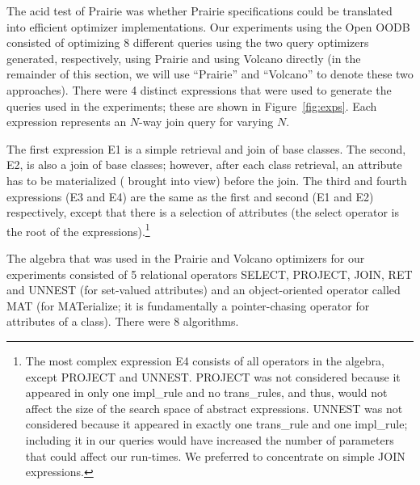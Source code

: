 The acid test of Prairie was whether Prairie specifications could be
translated into efficient optimizer implementations.  Our experiments
using the Open OODB consisted of optimizing 8 different queries using
the two query optimizers generated, respectively, using Prairie and
using Volcano directly (in the remainder of this section, we will use
``Prairie'' and ``Volcano'' to denote these two approaches).  There
were 4 distinct expressions that were used to generate the queries used
in the experiments; these are shown in Figure~\ref{fig:exps}.  Each
expression represents an $N$-way join query for varying $N$.

The first expression E1 is a simple retrieval and join of base
classes.  The second, E2, is also a join of base classes; however,
after each class retrieval, an attribute has to be materialized (\ie
brought into view) before the join.  The third and fourth expressions
(E3 and E4) are the same as the first and second (E1 and E2)
respectively, except that there is a selection of attributes (the
select operator is the root of the expressions).\footnote{ The most
complex expression E4 consists of all operators in the algebra, except
PROJECT and UNNEST.  PROJECT was not considered because it appeared in
only one impl\_rule and no trans\_rules, and thus, would not affect the
size of the search space of abstract expressions.  UNNEST was not
considered because it appeared in exactly one trans\_rule and one
impl\_rule; including it in our queries would have increased the number
of parameters that could affect our run-times.  We preferred to
concentrate on simple JOIN expressions.}

The algebra that was used in the Prairie and Volcano optimizers for our
experiments consisted of 5 relational operators SELECT, PROJECT, JOIN,
RET and UNNEST (for set-valued attributes) and an object-oriented
operator called MAT (for MATerialize; it is fundamentally a
pointer-chasing operator for attributes of a class).  There were 8
algorithms.

